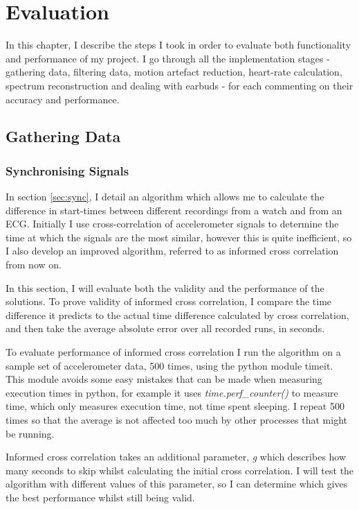\documentclass[12pt,a4paper,twoside,openright]{report}
\begin{document}
\chapter{Evaluation}

In this chapter, I describe the steps I took in order to evaluate both
functionality and performance of my project. I go through all the
implementation stages - gathering data, filtering data, motion artefact
reduction, heart-rate calculation, spectrum reconstruction and dealing with earbuds -
for each commenting on their accuracy and performance.

\section{Gathering Data}

\subsection{Synchronising Signals} \label{sec:evaluate-sync}

In section \ref{sec:sync}, I detail an algorithm which allows me to
calculate the difference in start-times between different recordings from a
watch and from an ECG. Initially I use cross-correlation of accelerometer signals to
determine the time at which the signals are the most similar, however this is
quite inefficient, so I also develop an improved algorithm, referred to as
informed cross correlation from now on.

In this section, I will evaluate both the validity and the performance of the
solutions. To prove validity of informed cross correlation, I compare the
time difference it predicts to the actual time difference calculated by cross
correlation, and then take the average absolute error over all recorded runs,
in seconds. 

To evaluate performance of informed cross correlation I run the
algorithm on a sample set of accelerometer data, 500 times, using the python
module timeit. This module avoids some easy mistakes that can be made when
measuring execution times in python, for example it uses
\emph{time.perf\_counter()} to measure time, which only measures execution
time, not time spent sleeping. I repeat 500 times so that the average is not
affected too much by other processes that might be running.

Informed cross correlation takes an additional parameter,
\emph{g} which describes how many seconds to skip whilst
calculating the initial cross correlation. I will test the algorithm with different
values of this parameter, so I can determine which gives the best performance
whilst still being valid. 
\end{document}
